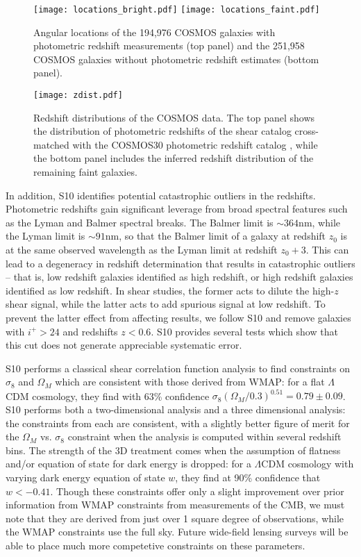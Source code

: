 \begin{figure}
  \centering
  \texttt{[image: locations\_bright.pdf]}
  \texttt{[image: locations\_faint.pdf]}
  \caption{Angular locations of the 194,976 COSMOS galaxies with photometric
    redshift measurements (top panel)
    and the 251,958 COSMOS galaxies without photometric redshift estimates
    (bottom panel).}
  \label{fig:COSMOS_locations}
\end{figure}

\begin{figure}
  \centering
  \texttt{[image: zdist.pdf]}
  \caption{Redshift distributions of the COSMOS data.  The top panel shows the
    distribution of photometric redshifts of the shear catalog cross-matched
    with the COSMOS30 photometric redshift catalog \citep{Ilbert09}, while
    the bottom panel includes the inferred redshift distribution of the
    remaining faint galaxies.}
  \label{fig:COSMOS_zdist}
\end{figure}

In addition, S10 identifies potential catastrophic outliers in the redshifts.
Photometric redshifts gain significant leverage from broad spectral features
such as the Lyman and Balmer spectral breaks.  The Balmer limit is
$\sim 364$nm, while the Lyman limit is $\sim 91$nm, so that the Balmer limit
of a galaxy at redshift $z_0$ is at the same observed wavelength as the
Lyman limit at redshift $z_0 + 3$.  This can lead to a degeneracy in redshift
determination that results in catastrophic outliers -- that is, low redshift
galaxies identified as high redshift, or high redshift galaxies identified as
low redshift.  In shear studies, the former acts to dilute the high-$z$
shear signal,
while the latter acts to add spurious signal at low redshift.  To prevent
the latter effect from affecting results, we follow S10 and remove galaxies
with $i^+ > 24$ and redshifts $z < 0.6$.  S10 provides several tests which
show that this cut does not generate appreciable systematic error.

S10 performs a classical shear correlation function analysis to find
constraints on $\sigma_8$ and $\Omega_M$ which are consistent with
those derived from WMAP: for a flat $\Lambda$CDM cosmology, they
find with 63\% confidence 
$\sigma_8(\Omega_M / 0.3)^{0.51} = 0.79 \pm 0.09$.  S10 performs both a
two-dimensional analysis and a three dimensional analysis: the constraints
from each are consistent, with a slightly better figure of merit for the
$\Omega_M$ vs. $\sigma_8$ constraint when the analysis is computed within
several redshift bins.  The strength of the
3D treatment comes when the assumption of flatness and/or equation of
state for dark energy is dropped: for a
$\Lambda$CDM cosmology with varying dark energy equation of state $w$,
they find at 90\% confidence that $w < -0.41$.
Though these constraints offer only a slight improvement over prior
information from WMAP constraints from measurements of the CMB, we must
note that they are derived from just over
1 square degree of observations, while the
WMAP constraints use the full sky.  Future wide-field
lensing surveys will be able to place much more competetive constraints
on these parameters.

